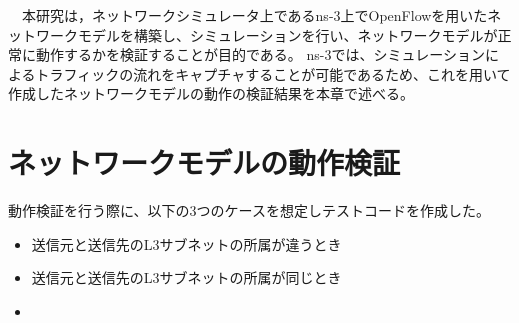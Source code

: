 \begin{comment}
\end{comment}

　本研究は，ネットワークシミュレータ上であるns-3上でOpenFlowを用いたネットワークモデルを構築し、シミュレーションを行い、ネットワークモデルが正常に動作するかを検証することが目的である。
ns-3では、シミュレーションによるトラフィックの流れをキャプチャすることが可能であるため、これを用いて作成したネットワークモデルの動作の検証結果を本章で述べる。

\section{ネットワークモデルの動作検証}

動作検証を行う際に、以下の3つのケースを想定しテストコードを作成した。

\begin{itemize}
	\item 送信元と送信先のL3サブネットの所属が違うとき
	\item 送信元と送信先のL3サブネットの所属が同じとき
	\item 
\end{itemize}


